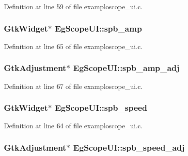 Definition at line 59 of file examploscope\+\_\+ui.\+c.

\subsubsection[{\texorpdfstring{spb\+\_\+amp}{spb_amp}}]{\setlength{\rightskip}{0pt plus 5cm}Gtk\+Widget$\ast$ Eg\+Scope\+U\+I\+::spb\+\_\+amp}\hypertarget{struct_eg_scope_u_i_a6c00d323085900bb188f4b8d51b4b5a3}{}\label{struct_eg_scope_u_i_a6c00d323085900bb188f4b8d51b4b5a3}


Definition at line 65 of file examploscope\+\_\+ui.\+c.

\subsubsection[{\texorpdfstring{spb\+\_\+amp\+\_\+adj}{spb_amp_adj}}]{\setlength{\rightskip}{0pt plus 5cm}Gtk\+Adjustment$\ast$ Eg\+Scope\+U\+I\+::spb\+\_\+amp\+\_\+adj}\hypertarget{struct_eg_scope_u_i_a404a1b0550c194bdb5c4ba54a2dd6ef8}{}\label{struct_eg_scope_u_i_a404a1b0550c194bdb5c4ba54a2dd6ef8}


Definition at line 67 of file examploscope\+\_\+ui.\+c.

\subsubsection[{\texorpdfstring{spb\+\_\+speed}{spb_speed}}]{\setlength{\rightskip}{0pt plus 5cm}Gtk\+Widget$\ast$ Eg\+Scope\+U\+I\+::spb\+\_\+speed}\hypertarget{struct_eg_scope_u_i_a0a9ef573042733a3b7ec034d2e72d87a}{}\label{struct_eg_scope_u_i_a0a9ef573042733a3b7ec034d2e72d87a}


Definition at line 64 of file examploscope\+\_\+ui.\+c.

\subsubsection[{\texorpdfstring{spb\+\_\+speed\+\_\+adj}{spb_speed_adj}}]{\setlength{\rightskip}{0pt plus 5cm}Gtk\+Adjustment$\ast$ Eg\+Scope\+U\+I\+::spb\+\_\+speed\+\_\+adj}\hypertarget{struct_eg_scope_u_i_ae358150017bf8958eceeff4f31c45587}{}\label{struct_eg_scope_u_i_ae358150017bf8958eceeff4f31c45587}



